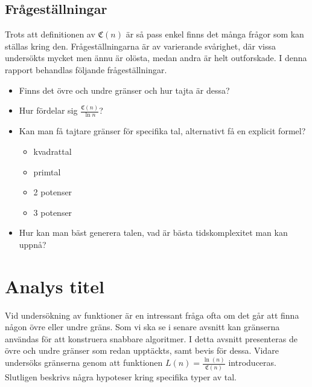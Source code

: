 \documentclass[a4paper,titlepage]{article}
\newcommand{\C}[1]{\mathfrak C \left( #1 \right)}
\newcommand{\FIX}[1]{{\color{red} \bf #1}}
\theoremstyle{definition}
\begin{document}
    \subsection{Frågeställningar}
            Trots att definitionen av $\C{n}$ är så pass enkel finns det många
            frågor som kan ställas kring den. Frågeställningarna är av
            varierande svårighet, där vissa undersökts mycket men ännu är olösta, medan
            andra är helt outforskade.
             I denna rapport behandlas följande frågeställningar.
            \begin{itemize}
            \item Finns det övre och undre gränser och hur tajta är dessa?
            \item Hur fördelar sig $\frac{\C{n}}{\ln{n}}$?
            \item Kan man få tajtare gränser för specifika tal, alternativt få
                en explicit formel?
                \begin{itemize}
                    \item kvadrattal
                    \item primtal
                    \item 2 potenser
                    \item 3 potenser

                \end{itemize}
            \item Hur kan man bäst generera talen, vad är bästa tidskomplexitet
                man kan uppnå?
        \end{itemize}


\section{Analys \FIX{titel}}
    Vid undersökning av funktioner är en intressant fråga ofta om det går att finna någon övre eller undre gräns.
    Som vi ska se i senare avsnitt kan gränserna användas för att konstruera snabbare algoritmer. 
    I detta avsnitt presenteras de övre och undre gränser som redan upptäckts,
    samt bevis för dessa. Vidare undersöks gränserna genom att funktionen $ L(n) = \frac{\ln(n)}{\C{n}}$ introduceras.
    Slutligen beskrivs några hypoteser kring specifika typer av tal. 
\end{document}
